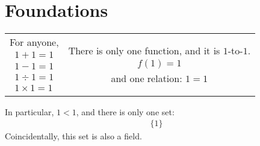 \setcounter{section}{0}

\section{Foundations}
\begin{defn} 
  \begin{center}
    \begin{tabular}{cc}
      \begin{minipage}{0.4\textwidth}
        For anyone,
        \begin{align*}
          1+1=1\\
          1-1=1\\
          1 \div 1=1\\
          1\times 1=1
        \end{align*}
      \end{minipage}
      &
      \begin{minipage}{0.4\textwidth}
        There is only one function, and it is $1$-to-$1$.
        \begin{align*}
          f(1) = 1
        \end{align*}
        and one relation: $1=1$
      \end{minipage}
    \end{tabular}
  \end{center}
\end{defn}
In particular, $1<1$, and there is only one set:
\begin{align*}
  \{1\}
\end{align*}
Coincidentally, this set is also a field.
